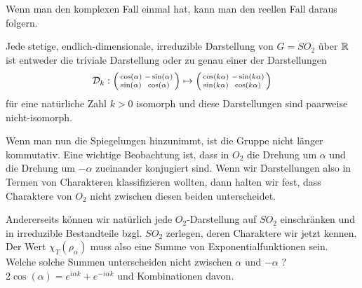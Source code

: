 \begin{remark}
Wenn man den komplexen Fall einmal hat, kann man den reellen Fall daraus folgern.
\end{remark}

\begin{corollary}[Darstellungstheorie von $SO_2$ über $\IK=\IR$]
Jede stetige, endlich-dimensionale, irreduzible Darstellung von $G=SO_2$ über $\mathbb{R}$ ist entweder die triviale Darstellung oder zu genau einer der Darstellungen
\[\mathcal{D}_k : \begin{psmallmatrix}\cos(\alpha)&-\sin(\alpha)\\\sin(\alpha)&\cos(\alpha)\end{psmallmatrix} \mapsto \begin{psmallmatrix}\cos(k\alpha)&-\sin(k\alpha)\\\sin(k\alpha)&\cos(k\alpha)\end{psmallmatrix}\]
für eine natürliche Zahl $k>0$ isomorph und diese Darstellungen sind paarweise nicht-isomorph.
\end{corollary}

\begin{remark}
Wenn man nun die Spiegelungen hinzunimmt, ist die Gruppe nicht länger kommutativ. Eine wichtige Beobachtung ist, dass in $O_2$ die Drehung um $\alpha$ und die Drehung um $-\alpha$ zueinander konjugiert sind. Wenn wir Darstellungen also in Termen von Charakteren klassifizieren wollten, dann halten wir fest, dass Charaktere von $O_2$ nicht zwischen diesen beiden unterscheidet.

Andererseits können wir natürlich jede $O_2$-Darstellung auf $SO_2$ einschränken und in irreduzible Bestandteile bzgl. $SO_2$ zerlegen, deren Charaktere wir jetzt kennen. Der Wert $\chi_T(\rho_\alpha)$ muss also eine Summe von Exponentialfunktionen sein. Welche solche Summen unterscheiden nicht zwischen $\alpha$ und $-\alpha$ ? $2\cos(\alpha) = e^{i\alpha k} + e^{-i\alpha k}$ und Kombinationen davon.
\end{remark}

